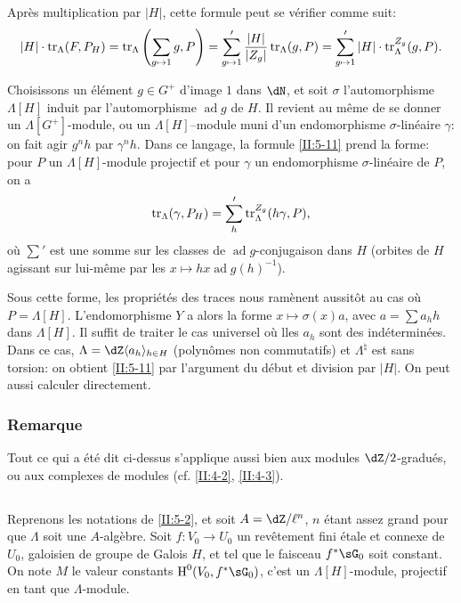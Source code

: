 Après multiplication par $|H|$, cette formule peut se vérifier comme suit: 
\[
  |H|\cdot \operatorname{tr}_\Lambda(F,P_H) 
    = \operatorname{tr}_\Lambda\left(\sum_{g\mapsto 1} g,P\right) 
    = \sum_{g\mapsto 1}' \frac{|H|}{|Z_g|}\operatorname{tr}_\Lambda(g,P) 
    = \sum_{g\mapsto 1}' |H|\cdot \operatorname{tr}_\Lambda^{Z_g}(g,P) \text{.}
\]

Choisissons un élément $g\in G^+$ d'image $1$ dans $\dN$, et soit 
$\sigma$ l'automorphisme $\Lambda[H]$ induit par l'automorphisme 
$\operatorname{ad} g$ de $H$. Il revient au même de se donner un 
$\Lambda[G^+]$-module, ou un $\Lambda[H]$--module muni d'un endomorphisme 
$\sigma$-linéaire $\gamma$: on fait agir $g^n h$ par $\gamma^n h$. Dans ce 
langage, la formule \ref{II:5-11} prend la forme: pour $P$ un 
$\Lambda[H]$-module projectif et pour $\gamma$ un endomorphisme 
$\sigma$-linéaire de $P$, on a 
\[
  \operatorname{tr}_\Lambda(\gamma,P_H) = \sum_h' \operatorname{tr}_\Lambda^{Z_g}(h\gamma,P)\text{,}
\]
où $\sum'$ est une somme sur les classes de $\operatorname{ad}g$-conjugaison 
dans $H$ (orbites de $H$ agissant sur lui-même par les 
$x\mapsto h x \operatorname{ad} g(h)^{-1}$). 

Sous cette forme, les propriétés des traces nous ramènent aussitôt au 
cas où $P=\Lambda[H]$. L'endomorphisme $Y$ a alors la forme 
$x\mapsto \sigma(x) a$, avec $a=\sum a_h h$ dans $\Lambda[H]$. Il suffit de 
traiter le cas universel où lles $a_h$ sont des indéterminées. Dans ce 
cas, $\Lambda=\dZ\langle a_h\rangle_{h\in H}$ (polynômes non commutatifs) et 
$\Lambda^\natural$ est sans torsion: on obtient \ref{II:5-11} par l'argument 
du début et division par $|H|$. On peut aussi calculer directement. 





\subsubsection{Remarque}\label{II:5-11-1}

Tout ce qui a été dit ci-dessus s'applique aussi bien aux modules 
$\dZ/2$-gradués, ou aux complexes de modules (cf. \ref{II:4-2}, \ref{II:4-3}). 





\subsection{}\label{II:5-12}

Reprenons les notations de \ref{II:5-2}, et soit $A=\dZ/\ell^n$, $n$ étant 
assez grand pour que $\Lambda$ soit une $A$-algèbre. Soit $f:V_0\to U_0$ un 
revêtement fini étale et connexe de $U_0$, galoisien de groupe de Galois 
$H$, et tel que le faisceau $f^*\sG_0$ soit constant. On note $M$ le valeur 
constants $\h^0(V_0,f^*\sG_0)$, c'est un $\Lambda[H]$-module, projectif en 
tant que $\Lambda$-module. 

